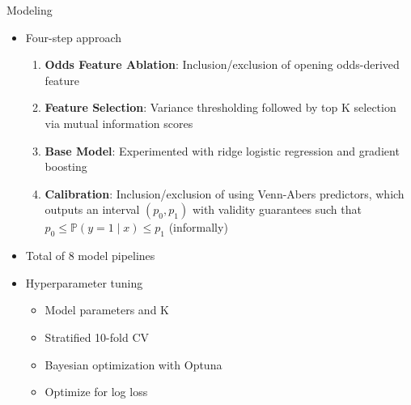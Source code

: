 \documentclass[aspectratio=169,xcolor=dvipsnames]{beamer}
\begin{document}
\begin{frame}{Modeling}
    \begin{itemize}
        \item Four-step approach
        \begin{enumerate}
             \item \textbf{Odds Feature Ablation}: Inclusion/exclusion of opening odds-derived feature

            \item \textbf{Feature Selection}: Variance thresholding followed by top K selection via mutual information scores
    
            \item \textbf{Base Model}: Experimented with ridge logistic regression and gradient boosting
    
            \item \textbf{Calibration}: Inclusion/exclusion of using Venn-Abers predictors, which outputs an interval $(p_0, p_1)$ with validity guarantees such that
            $p_0 \leq \mathbb{P}(y = 1 \mid x) \leq p_1$ (informally)
        \end{enumerate}

        \item Total of 8 model pipelines

        \item Hyperparameter tuning
        \begin{itemize}
            \item Model parameters and K

            \item Stratified 10-fold CV

            \item Bayesian optimization with Optuna

            \item Optimize for log loss
        \end{itemize}
    \end{itemize}
\end{frame}

\end{document}
